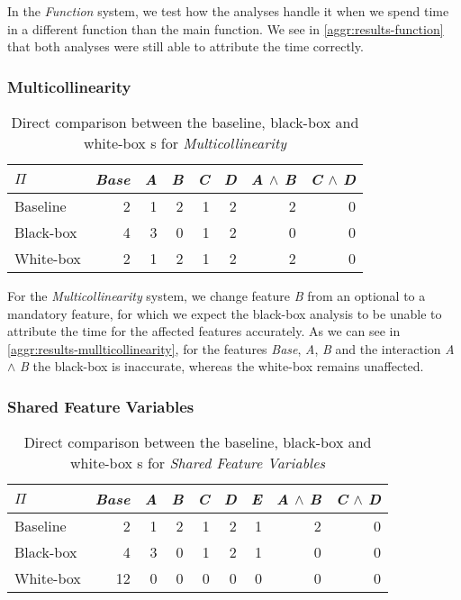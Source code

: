 In the \emph{Function} system, we test how the analyses handle it when we spend time in a different function than the main function. 
We see in \autoref{aggr:results-function} that both analyses were still able to attribute the time correctly.

\subsubsection*{Multicollinearity}

\begin{table}[H]
    \centering
    \begin{tabular}{lrrrrrrr}
    \toprule
    $\Pi$    & \emph{Base} & \emph{A} & \emph{B} & \emph{C} & \emph{D} & \emph{A} $\land$ \emph{B} & \emph{C} $\land$ \emph{D}  \\ \midrule
    Baseline & 2    & 1 & 2 & 1 & 2 & 2           & 0            \\
    Black-box & 4   & 3 & 0 & 1 & 2 & 0           & 0            \\
    White-box & 2   & 1 & 2 & 1 & 2 & 2           & 0            \\ \bottomrule
    \end{tabular}  
    \caption{Direct comparison between the baseline, black-box and white-box {\perfInfluenceModel}s for \emph{Multicollinearity}}
    \label{aggr:results-mullticollinearity}
\end{table}

For the \emph{Multicollinearity} system, we change feature \emph{B} from an optional to a mandatory feature, 
for which we expect the black-box analysis to be unable to attribute the time for the affected features accurately. 
As we can see in \autoref{aggr:results-mullticollinearity}, for the features \emph{Base}, \emph{A}, \emph{B} and 
the interaction \emph{A} $\land$ \emph{B} the black-box is inaccurate, whereas the white-box remains unaffected.

\subsubsection*{Shared Feature Variables}

\begin{table}[H]
    \centering
    \begin{tabular}{lrrrrrrrr}
    \toprule
    $\Pi$    & \emph{Base} & \emph{A} & \emph{B} & \emph{C} & \emph{D} & \emph{E}& \emph{A} $\land$ \emph{B} & \emph{C} $\land$ \emph{D}  \\ \midrule
    Baseline & 2    & 1 & 2 & 1 & 2 & 1 & 2           & 0            \\
    Black-box & 4   & 3 & 0 & 1 & 2 & 1 & 0           & 0            \\
    White-box & 12   & 0 & 0 & 0 & 0 & 0 & 0           & 0            \\ \bottomrule
    \end{tabular}  
    \caption{Direct comparison between the baseline, black-box and white-box {\perfInfluenceModel}s for \emph{Shared Feature Variables}}
    \label{aggr:results-shared-feature}
\end{table}

